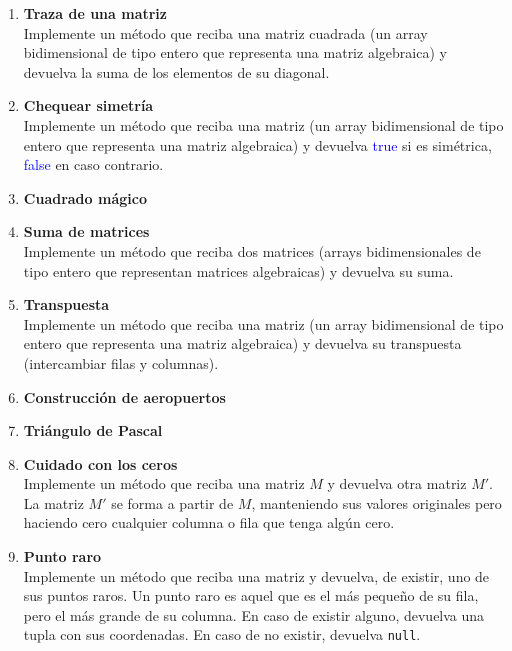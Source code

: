 \begin{enumerate}
    \item \textbf{Traza de una matriz}\\
    Implemente un método que reciba una matriz cuadrada (un array bidimensional de tipo entero que representa una matriz algebraica) y devuelva la suma de los elementos de su diagonal.

    \item \textbf{Chequear simetría}\\
    Implemente un método que reciba una matriz (un array bidimensional de tipo entero que representa una matriz algebraica) y devuelva \textcolor{blue}{true} si es simétrica, \textcolor{blue}{false} en caso contrario.

    \item \textbf{Cuadrado mágico}\\
    

    \item \textbf{Suma de matrices}\\
    Implemente un método que reciba dos matrices (arrays bidimensionales de tipo entero que representan matrices algebraicas) y devuelva su suma.

    \item \textbf{Transpuesta}\\
    Implemente un método que reciba una matriz (un array bidimensional de tipo entero que representa una matriz algebraica) y devuelva su transpuesta (intercambiar filas y columnas).

    \item \textbf{Construcción de aeropuertos}\\
    

    \item \textbf{Triángulo de Pascal}\\
    

    \item \textbf{Cuidado con los ceros}\\
    Implemente un método que reciba una matriz \(M\) y devuelva otra matriz \(M'\). La matriz \(M'\) se forma a partir de \(M\), manteniendo sus valores originales pero haciendo cero cualquier columna o fila que tenga algún cero.

    \item \textbf{Punto raro}\\ 
    Implemente un método que reciba una matriz y devuelva, de existir, uno de sus puntos raros. Un punto raro es aquel que es el más pequeño de su fila, pero el más grande de su columna. En caso de existir alguno, devuelva una tupla con sus coordenadas. En caso de no existir, devuelva \texttt{null}.	


\end{enumerate}
